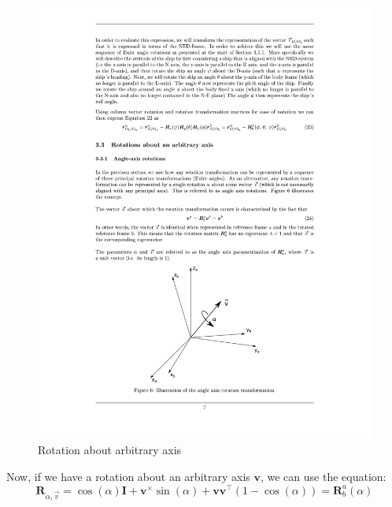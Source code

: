 \begin{figure}[H]
    \centering
    \includegraphics[scale=1, trim={7cm 3.5cm 7cm 16.5cm}, clip]{figures/arbitrary_axis_rotation.pdf}
    \caption{Rotation about arbitrary axis}
    \label{fig:arbitrary_axis_rotation}
\end{figure}
Now, if we have a rotation about an arbitrary axis $\mathbf{v}$, we can use the equation:
\begin{equation}
    \mathbf{R}_{\alpha,\vec{v}} = \cos(\alpha)\mathbf{I} + \mathbf{v}^\times\sin(\alpha) + \mathbf{vv}^\top(1-\cos(\alpha)) = \mathbf{R}_b^a(\alpha)
\end{equation}
